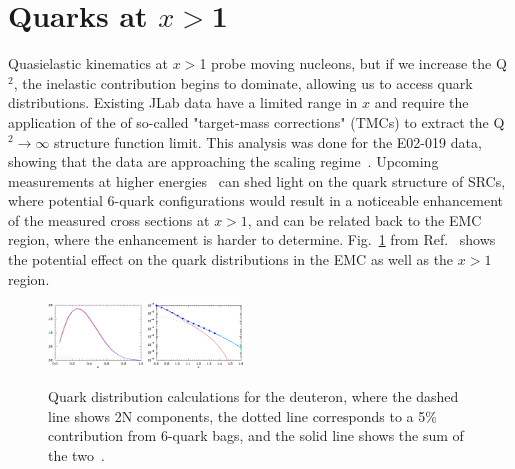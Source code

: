 \section{Quarks at $x>$1}
Quasielastic kinematics at $x>$1 probe moving nucleons, but if we increase the Q$^2$, the inelastic contribution begins to dominate, allowing us to access quark distributions. Existing JLab data have a limited range in $x$ and require the application of the of so-called "target-mass corrections" (TMCs) to extract the Q$^2\rightarrow\infty$ structure function limit.  This analysis was done for the E02-019 data, showing that the data are approaching the scaling regime~\cite{Fomin:2010ei}.  Upcoming measurements at higher energies~\cite{12gev_xgt1} can shed light on the quark structure of SRCs, where potential 6-quark configurations would result in a noticeable enhancement of the measured cross sections at $x>1$, and can be related back to the EMC region, where the enhancement is harder to determine.  Fig.~\ref{fig:quarkbags} from Ref.~\cite{Arrington:2003qt} shows the potential effect on the quark distributions in the EMC as well as the $x>1$ region.
\begin{figure}[htb]
  \includegraphics[width=0.225\textwidth]{plots/qofx2_lin_5per.eps}
  \includegraphics[width=0.225\textwidth]{plots/qofx2_log_5per.eps}
  \caption{Quark distribution calculations for the deuteron, where the dashed line shows 2N components, the dotted line corresponds to a 5\% contribution from 6-quark bags, and the solid line shows the sum of the two~\cite{Mulders:1983au}. }
  \label{fig:quarkbags}
\end{figure}


